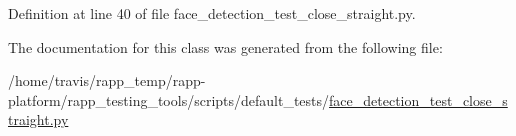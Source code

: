 Definition at line 40 of file face\-\_\-detection\-\_\-test\-\_\-close\-\_\-straight.\-py.



The documentation for this class was generated from the following file\-:\begin{DoxyCompactItemize}
\item 
/home/travis/rapp\-\_\-temp/rapp-\/platform/rapp\-\_\-testing\-\_\-tools/scripts/default\-\_\-tests/\hyperlink{face__detection__test__close__straight_8py}{face\-\_\-detection\-\_\-test\-\_\-close\-\_\-straight.\-py}\end{DoxyCompactItemize}
